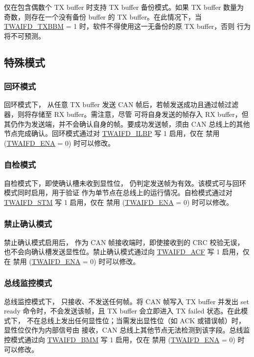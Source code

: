 \documentclass[main\_\_CN.tex]{subfiles}
\begin{document}
\modulename{} 仅在包含偶数个 TX buffer 时支持 TX buffer 备份模式。如果 TX buffer 数量为奇数，则存在一个没有备份 buffer 的 TX buffer。在此情况下，当 \hyperref[fielddesc:TWAIFDTXBBM]{TWAIFD\_TXBBM} = 1 时，软件不得使用这一无备份的原 TX buffer，否则 \modulename{} 行为将不可预测。


\subsection{特殊模式}

\subsubsection{回环模式}

回环模式下，\modulename{} 从任意 TX buffer 发送 CAN 帧后，若帧发送成功且通过帧过滤器，则将存储至 RX buffer。需注意，尽管\modulename{} 可将自身发送的帧存入 RX buffer，但其仍作为发送端，并不会确认自身的帧。要成功发送帧，须由 CAN 总线上的其他节点完成确认。回环模式通过对 \hyperref[fielddesc:TWAIFDILBP]{TWAIFD\_ILBP} 写 1 启用，仅在 \modulename{} 禁用 (\hyperref[fielddesc:TWAIFDENA]{TWAIFD\_ENA} = 0) 时可以修改。

\subsubsection{自检模式}

自检模式下，即使确认槽未收到显性位，\modulename{} 仍判定发送帧为有效。该模式可与回环模式同时启用，用于验证 \modulename{} 作为单节点在总线上的运行情况。自检模式通过对 \hyperref[fielddesc:TWAIFDSTM]{TWAIFD\_STM} 写 1 启用，仅在 \modulename{} 禁用 (\hyperref[fielddesc:TWAIFDENA]{TWAIFD\_ENA} = 0) 时可以修改。

\subsubsection{禁止确认模式}

禁止确认模式启用后，\modulename{} 作为 CAN 帧接收端时，即使接收到的 CRC 校验无误，也不会向确认槽发送显性位。禁止确认模式通过向 \hyperref[fielddesc:TWAIFDACF]{TWAIFD\_ACF} 写 1 启用，仅在 \modulename{} 禁用 (\hyperref[fielddesc:TWAIFDENA]{TWAIFD\_ENA} = 0) 时可以修改。


\subsubsection{总线监控模式}

总线监控模式下，\modulename{} 只接收、不发送任何帧。将 CAN 帧写入 TX buffer 并发出 set ready 命令时，不会发送该帧，且 TX buffer 会立即进入 TX failed 状态。在此模式下，\modulename{} 不在总线上发出任何显性位；当需发出显性位（如 ACK 或错误帧）时，显性位仅作为内部信号由 \modulename{} 接收，CAN 总线上其他节点无法检测到该字段。总线监控模式通过向 \hyperref[fielddesc:TWAIFDBMM]{TWAIFD\_BMM} 写 1 启用，仅在 \modulename{} 禁用 (\hyperref[fielddesc:TWAIFDENA]{TWAIFD\_ENA} = 0) 时可以修改。
\end{document}
